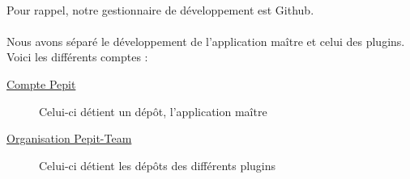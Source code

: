 \paragraph{}Pour rappel, notre gestionnaire de développement est Github.
\paragraph{}Nous avons séparé le développement de l'application ma\^{i}tre et celui des plugins. Voici les différents comptes :
\begin{description}
\item[\href{https://github.com/pepit/PepitMobil}{Compte Pepit}] Celui-ci détient un dép\^{o}t, l'application ma\^{i}tre
\item[\href{https://github.com/pepit-team}{Organisation Pepit-Team}] Celui-ci détient les dép\^{o}ts des différents plugins
\end{description}